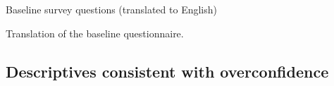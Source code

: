 \cleardoublepage

\begin{table}[H]
\caption{Baseline survey questions (translated to English)}
\label{baseline_survey}
\begin{center}
\scriptsize{}
\end{center}
\scriptsize
Translation of the baseline questionnaire.
\end{table}

\cleardoublepage

\newpage
\subsection{Descriptives consistent with overconfidence}

\vspace{.2in}
